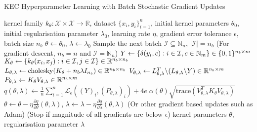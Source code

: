 \documentclass{article}
\begin{document}
	\begin{algorithm}[tb]
		\caption{KEC Hyperparameter Learning with Batch Stochastic Gradient Updates}
		\label{alg:kernel_embedding_classifier_training}
		\begin{algorithmic}[1]
			 kernel family $k_{\theta} : \mathcal{X} \times \mathcal{X} \to \mathbb{R}$, dataset $\{x_{i}, y_{i}\}_{i = 1}^{n}$, initial kernel parameters $\theta_{0}$, initial regularisation parameter $\lambda_{0}$, learning rate $\eta$, gradient error tolerance $\epsilon$, batch size $n_{b}$
			\STATE $\theta \leftarrow \theta_{0}$, $\lambda \leftarrow \lambda_{0}$
			\REPEAT
			\STATE Sample the next batch $\mathcal{I} \subseteq \mathbb{N}_{n}$, $| \mathcal{I} | = n_{b}$ \hspace{\fill} (For gradient descent, $n_{b} = n$ and $\mathcal{I} = \mathbb{N}_{n}$)
			\STATE $Y \leftarrow \{\delta(y_{i}, c) : i \in \mathcal{I}, c \in \mathbb{N}_{m}\} \hspace{\fill} \in \{0, 1\}^{n_{b} \times m}$
			\STATE $K_{\theta} \leftarrow \{k_{\theta}(x_{i}, x_{j}) : i \in \mathcal{I}, j \in \mathcal{I}\} \hspace{\fill} \in \mathbb{R}^{n_{b} \times n_{b}}$
			\STATE $L_{\theta, \lambda} \leftarrow \mathrm{cholesky}(K_{\theta} + n_{b} \lambda I_{n_{b}}) \hspace{\fill} \in \mathbb{R}^{n_{b} \times n_{b}}$
			\STATE $V_{\theta, \lambda} \leftarrow L_{\theta, \lambda}^{T} \backslash (L_{\theta, \lambda} \backslash Y) \hspace{\fill} \in \mathbb{R}^{n_{b} \times m}$
			\STATE $P_{\theta, \lambda} \leftarrow K_{\theta} V_{\theta, \lambda} \hspace{\fill} \in \mathbb{R}^{n_{b} \times m}$
			\STATE $q(\theta, \lambda) \leftarrow \frac{1}{n} \sum_{i = 1}^{n} \mathcal{L}_{\epsilon}((Y)_{i}, (P_{\theta, \lambda})_{i}) + 4 e \; \alpha(\theta) \sqrt{\mathrm{trace}(V_{\theta, \lambda}^{T} K_{\theta} V_{\theta, \lambda})}$
			\STATE $\theta \leftarrow \theta - \eta \frac{\partial q}{\partial \theta}(\theta, \lambda)$, $\lambda \leftarrow \lambda - \eta \frac{\partial q}{\partial \lambda}(\theta, \lambda)$ \hspace{\fill} (Or other gradient based updates such as Adam)
			 \hspace{\fill} (Stop if magnitude of all gradients are below $\epsilon$)
			 kernel parameters $\theta$, regularisation parameter $\lambda$
		\end{algorithmic}
	\end{algorithm}
\end{document}
